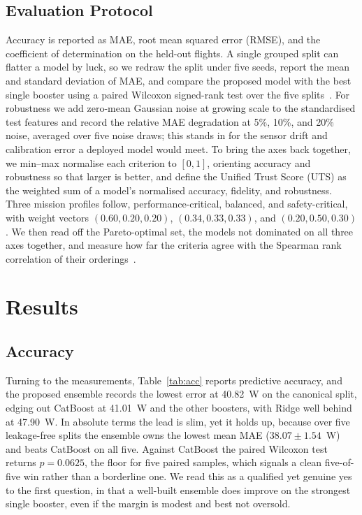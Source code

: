 \documentclass[conference]{IEEEtran}
\begin{document}
\subsection{Evaluation Protocol}
\label{sec:robust}
Accuracy is reported as MAE, root mean squared error (RMSE), and the coefficient of determination on the held-out flights. A single grouped split can flatter a model by luck, so we redraw the split under five seeds, report the mean and standard deviation of MAE, and compare the proposed model with the best single booster using a paired Wilcoxon signed-rank test over the five splits~\cite{wilcoxon1945individual}. For robustness we add zero-mean Gaussian noise at growing scale to the standardised test features and record the relative MAE degradation at 5\%, 10\%, and 20\% noise, averaged over five noise draws; this stands in for the sensor drift and calibration error a deployed model would meet. To bring the axes back together, we min--max normalise each criterion to $[0,1]$, orienting accuracy and robustness so that larger is better, and define the Unified Trust Score (UTS) as the weighted sum of a model's normalised accuracy, fidelity, and robustness. Three mission profiles follow, performance-critical, balanced, and safety-critical, with weight vectors $(0.60,0.20,0.20)$, $(0.34,0.33,0.33)$, and $(0.20,0.50,0.30)$. We then read off the Pareto-optimal set, the models not dominated on all three axes together, and measure how far the criteria agree with the Spearman rank correlation of their orderings~\cite{spearman1904proof}.

\section{Results}

\subsection{Accuracy}
Turning to the measurements, Table~\ref{tab:acc} reports predictive accuracy, and the proposed ensemble records the lowest error at 40.82~W on the canonical split, edging out CatBoost at 41.01~W and the other boosters, with Ridge well behind at 47.90~W. In absolute terms the lead is slim, yet it holds up, because over five leakage-free splits the ensemble owns the lowest mean MAE ($38.07 \pm 1.54$~W) and beats CatBoost on all five. Against CatBoost the paired Wilcoxon test returns $p=0.0625$, the floor for five paired samples, which signals a clean five-of-five win rather than a borderline one. We read this as a qualified yet genuine yes to the first question, in that a well-built ensemble does improve on the strongest single booster, even if the margin is modest and best not oversold.
\end{document}
